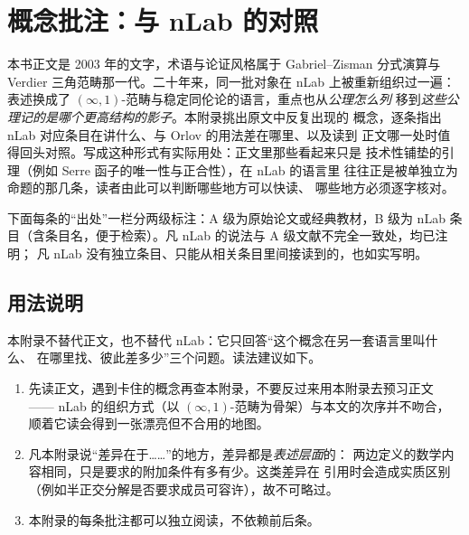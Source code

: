 \chapter{概念批注：与 nLab 的对照}
\label{app:nlab}

本书正文是 2003 年的文字，术语与论证风格属于 Gabriel--Zisman 分式演算与
Verdier 三角范畴那一代。二十年来，同一批对象在 nLab 上被重新组织过一遍：
表述换成了 $(\infty,1)$-范畴与稳定同伦论的语言，重点也从\emph{公理怎么列}
移到\emph{这些公理记的是哪个更高结构的影子}。本附录挑出原文中反复出现的
概念，逐条指出 nLab 对应条目在讲什么、与 Orlov 的用法差在哪里、以及读到
正文哪一处时值得回头对照。写成这种形式有实际用处：正文里那些看起来只是
技术性铺垫的引理（例如 Serre 函子的唯一性与正合性），在 nLab 的语言里
往往正是被单独立为命题的那几条，读者由此可以判断哪些地方可以快读、
哪些地方必须逐字核对。

下面每条的“出处”一栏分两级标注：A 级为原始论文或经典教材，B 级为 nLab
条目（含条目名，便于检索）。凡 nLab 的说法与 A 级文献不完全一致处，均已注明；
凡 nLab 没有独立条目、只能从相关条目里间接读到的，也如实写明。

\section{用法说明}

本附录不替代正文，也不替代 nLab：它只回答“这个概念在另一套语言里叫什么、
在哪里找、彼此差多少”三个问题。读法建议如下。

\begin{enumerate}
  \item 先读正文，遇到卡住的概念再查本附录，不要反过来用本附录去预习正文 ——
        nLab 的组织方式（以 $(\infty,1)$-范畴为骨架）与本文的次序并不吻合，
        顺着它读会得到一张漂亮但不合用的地图。
  \item 凡本附录说“差异在于……”的地方，差异都是\emph{表述层面}的：
        两边定义的数学内容相同，只是要求的附加条件有多有少。这类差异在
        引用时会造成实质区别（例如半正交分解是否要求成员可容许），故不可略过。
  \item 本附录的每条批注都可以独立阅读，不依赖前后条。
\end{enumerate}

